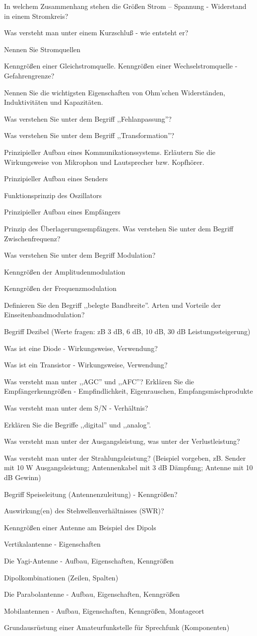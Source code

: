 \documentclass[avery5371,grid,frame,a4paper]{flashcards}
\newcommand\question[2]{
  \begin{flashcard}[{\chap} -- #1]{#2}\end{flashcard}
}
\begin{document}
\question{01}{In welchem Zusammenhang stehen die Größen Strom – Spannung - Widerstand in einem Stromkreis?}
\question{02}{Was versteht man unter einem Kurzschluß - wie entsteht er?}
\question{03}{Nennen Sie Stromquellen}
\question{04}{Kenngrößen einer Gleichstromquelle. Kenngrößen einer Wechselstromquelle - Gefahrengrenze?}
\question{06}{Nennen Sie die wichtigsten Eigenschaften von Ohm'schen Widerständen, Induktivitäten und Kapazitäten.}
\question{07}{Was verstehen Sie unter dem Begriff ,,Fehlanpassung''?}
\question{08}{Was verstehen Sie unter dem Begriff ,,Transformation''?}
\question{09}{Prinzipieller Aufbau eines Kommunikationssystems. Erläutern Sie die Wirkungsweise von Mikrophon und Lautsprecher bzw. Kopfhörer.}
\question{11}{Prinzipieller Aufbau eines Senders}
\question{12}{Funktionsprinzip des Oszillators}
\question{13}{Prinzipieller Aufbau eines Empfängers}
\question{14}{Prinzip des Überlagerungsempfängers. Was verstehen Sie unter dem Begriff Zwischenfrequenz?}
\question{16}{Was verstehen Sie unter dem Begriff Modulation?}
\question{17}{Kenngrößen der Amplitudenmodulation}
\question{18}{Kenngrößen der Frequenzmodulation}
\question{19}{Definieren Sie den Begriff ,,belegte Bandbreite''. Arten und Vorteile der Einseitenbandmodulation?}
\question{21}{Begriff Dezibel (Werte fragen: zB 3 dB, 6 dB, 10 dB, 30 dB Leistungssteigerung)}
\question{22}{Was ist eine Diode - Wirkungsweise, Verwendung?}
\question{23}{Was ist ein Transistor - Wirkungsweise, Verwendung?}
\question{24}{Was versteht man unter ,,AGC'' und ,,AFC''? Erklären Sie die Empfängerkenngrößen - Empfindlichkeit, Eigenrauschen, Empfangsmischprodukte}
\question{26}{Was versteht man unter dem S/N - Verhältnis?}
\question{27}{Erklären Sie die Begriffe ,,digital'' und ,,analog''.}
\question{28}{Was versteht man unter der Ausgangsleistung, was unter der Verlustleistung?}
\question{29}{Was versteht man unter der Strahlungsleistung? (Beispiel vorgeben, zB. Sender mit 10 W Ausgangsleistung; Antennenkabel mit 3 dB Dämpfung; Antenne mit 10 dB Gewinn)}
\question{30}{Begriff Speiseleitung (Antennenzuleitung) - Kenngrößen?}
\question{31}{Auswirkung(en) des Stehwellenverhältnisses (SWR)?}
\question{32}{Kenngrößen einer Antenne am Beispiel des Dipols}
\question{33}{Vertikalantenne - Eigenschaften}
\question{34}{Die Yagi-Antenne - Aufbau, Eigenschaften, Kenngrößen}
\question{35}{Dipolkombinationen (Zeilen, Spalten)}
\question{36}{Die Parabolantenne - Aufbau, Eigenschaften, Kenngrößen}
\question{37}{Mobilantennen - Aufbau, Eigenschaften, Kenngrößen, Montageort}
\question{38}{Grundausrüstung einer Amateurfunkstelle für Sprechfunk (Komponenten)}
\end{document}
